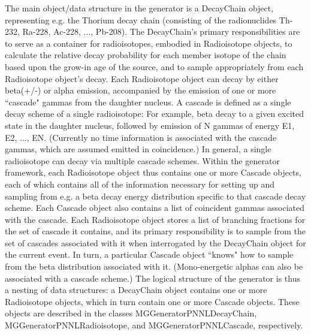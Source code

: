  The main object/data structure in the generator is a DecayChain object, 
representing e.g. the Thorium decay chain (consisting of the radionuclides 
Th-{}232, Ra-{}228, Ac-{}228, ..., Pb-{}208). The DecayChain's primary 
responsibilities are to serve as a container for radioisotopes, embodied in 
Radioisotope objects, to calculate the relative decay probability for each 
member isotope of the chain based upon the grow-{}in age of the source, and to 
sample appropriately from each Radioisotope object's decay.  Each Radioisotope
object can decay by either beta(+/-{}) or alpha emission, accompanied by the 
emission of one or more ``cascade" gammas from the daughter nucleus.  A cascade
is defined as a single decay scheme of a single radioisotope: For example, 
beta decay to a given excited state in the daughter nucleus, followed by 
emission of N gammas of energy E1, E2, ..., EN.  (Currently no time 
information is associated with the cascade gammas, which are assumed emitted 
in coincidence.) In general, a single radioisotope can decay via multiple 
cascade schemes.  Within the generator framework, each Radioisotope object 
thus contains one or more Cascade objects, each of which contains all of the 
information necessary for setting up and sampling from e.g. a beta decay 
energy distribution specific to that cascade decay scheme.  Each Cascade 
object also contains a list of coincident gammas associated with the cascade.
Each Radioisotope object stores a list of branching fractions for the set
of cascade it contains, and its primary responsibility is to sample from
the set of cascades associated with it when interrogated by the DecayChain
object for the current event.  In turn, a particular Cascade object ``knows"
how to sample from the beta distribution associated with it.  (Mono-{}energetic
alphas can also be associated with a cascade scheme.)  The logical structure 
of the generator is thus a nesting of data structures: a DecayChain object 
contains one or more Radioisotope objects, which in turn contain one or more 
Cascade objects.  These objects are described in the classes 
MGGeneratorPNNLDecayChain, MGGeneratorPNNLRadioisotope, and 
MGGeneratorPNNLCascade, respectively.
 

